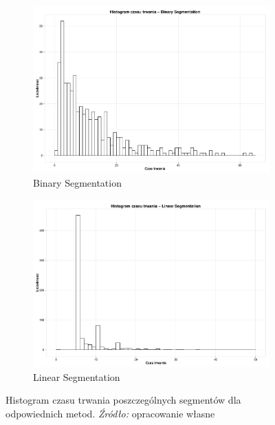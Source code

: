 \documentclass[polish, twoside, 12pt, a4paper]{article}
\theoremstyle{definition}
\theoremstyle{plain}
\theoremstyle{remark}
\begin{document}
\begin{figure}[H]
  \centering
  \begin{subfigure}[t]{0.45\textwidth}
    \includegraphics[width=\textwidth]{./rys006}
    \caption{Binary Segmentation}
    \label{xxxa}
  \end{subfigure}
  \hfill
  \begin{subfigure}[t]{0.45\textwidth}
    \includegraphics[width=\textwidth]{./rys007}
    \caption{Linear Segmentation}
    \label{xxxb}
  \end{subfigure}
  \captionsetup{margin=10pt,font=small,labelfont=bf,width=.8\textwidth}
  \caption[Histogram czasu trwania- segmentacja liniowa oraz binarna]{Histogram czasu trwania poszczególnych segmentów dla odpowiednich metod. \textit{Źródło:} opracowanie własne}\label{rys018}
\end{figure}
\end{document}
